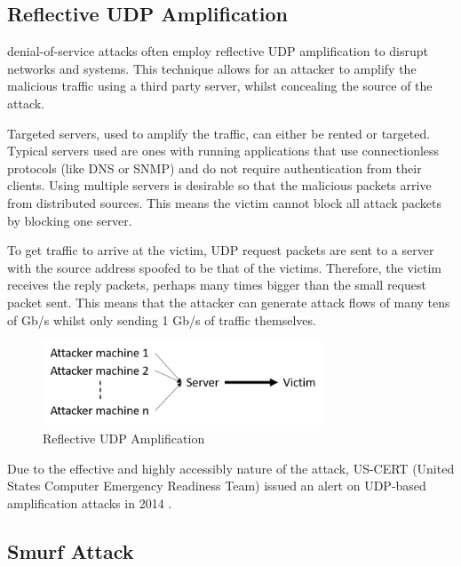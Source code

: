 \documentclass[12pt,twoside]{article}
\begin{document}
\subsection{Reflective UDP Amplification}
denial-of-service attacks often employ reflective UDP amplification to disrupt networks and systems. This technique allows for an attacker to amplify the malicious traffic using a third party server, whilst concealing the source of the attack.

Targeted servers, used to amplify the traffic, can either be rented or targeted. Typical servers used are ones with running applications that use connectionless protocols (like DNS or SNMP) and do not require authentication from their clients. Using multiple servers is desirable so that the malicious packets arrive from distributed sources. This means the victim cannot block all attack packets by blocking one server.

To get traffic to arrive at the victim, UDP request packets are sent to a server with the source address spoofed to be that of the victims. Therefore, the victim receives the reply packets, perhaps many times bigger than the small request packet sent. This means that the attacker can generate attack flows of many tens of Gb/s whilst only sending 1 Gb/s of traffic themselves.

\begin{figure}[h]
	\begin{center}
		\includegraphics[width=8.36cm, height=2.52cm]{figures/udp-amplification}
	\end{center}
	\caption{Reflective UDP Amplification}
	\label{figure_amplification} 
\end{figure}

Due to the effective and highly accessibly nature of the attack, US-CERT (United States Computer Emergency Readiness Team) issued an alert on UDP-based amplification attacks in 2014 \cite{USCERT}.
\subsection{Smurf Attack}
\end{document}
